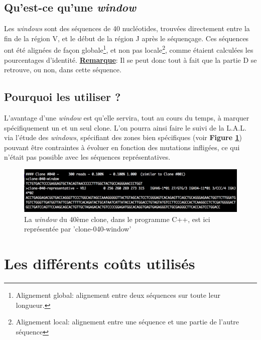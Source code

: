\documentclass[pdftex,12pt,a4paper]{report}
\begin{document}
\begin{spacing}{1.2}
\subsection{Qu'est-ce qu'une \textit{window}}

Les \textit{windows} sont des séquences de 40 nucléotides, trouvées directement entre la fin de la région V, et le début de la région J après le séquençage. Ces séquences ont été alignées de façon globale\footnote{Alignement global: alignement entre deux séquences sur toute leur longueur.}, et non pas locale\footnote{Alignement local: alignement entre une séquence et une partie de l'autre séquence}, comme étaient calculées les pourcentages d'identité.
\newline
\underline{\textbf{Remarque}}: Il se peut donc tout à fait que la partie D se retrouve, ou non, dans cette séquence.

\subsection{Pourquoi les utiliser ?}

L'avantage d'une \textit{window} est qu'elle servira, tout au cours du temps, à marquer spécifiquement un et un seul clone. L'on pourra ainsi faire le suivi de la L.A.L. via l'étude des \textit{windows}, spécifiant des zones bien spécifiques (voir \textbf{Figure \ref{fig:windows_c++}}) pouvant être contraintes à évoluer en fonction des mutations infligées, ce qui n'était pas possible avec les séquences représentatives.

\begin{figure}[H]
\begin{center}
	\includegraphics[scale=0.6]{img/C++-window.jpg}
\end{center}
\caption{La \textit{window} du 40ème clone, dans le programme C++, est ici représentée par 'clone-040-window'}
\label{fig:windows_c++}
\end{figure}

\section{Les différents coûts utilisés}


\end{spacing}
\end{document}
